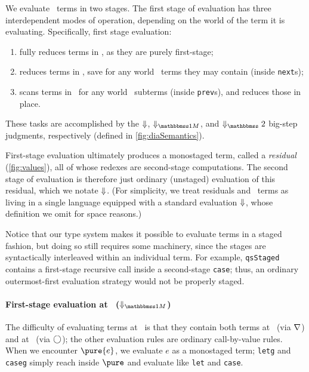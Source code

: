 \begin{abstrsyn}

We evaluate \lang\ terms in two stages. The first stage of evaluation has 
three interdependent modes of operation, depending on the world of the term it is evaluating.
Specifically, first stage evaluation:
\begin{enumerate}
\item fully reduces terms in \bbonep, as they are purely first-stage;
\item reduces terms in \bbonem, save for any world \bbtwo\ terms they may
contain (inside \texttt{next}s);
\item scans terms in \bbtwo\ for any world \bbonem\ subterms (inside \texttt{prev}s), 
and reduces those in place.
\end{enumerate}
These tasks are accomplished by the ${\Downarrow}$, $\redonesym$, and $\redtwosym$
big-step judgments, respectively (defined in \ref{fig:diaSemantics}).

First-stage evaluation ultimately produces a monostaged term, called a \emph{residual}
(\ref{fig:values}), all of whose redexes are second-stage computations. The
second stage of evaluation is therefore just ordinary (unstaged) evaluation of
this residual, which we notate ${\Downarrow}$. (For simplicity, we treat residuals
and \bbonep\ terms as living in a single language equipped with a standard
evaluation ${\Downarrow}$, whose definition we omit for space reasons.)

Notice that our type system makes it possible to evaluate terms in a staged
fashion, but doing so still requires some machinery, since the stages are
syntactically interleaved within an individual term. For example,
\texttt{qsStaged} contains a first-stage recursive call inside a second-stage
\texttt{case}; thus, an ordinary outermost-first evaluation strategy would not
be properly staged.

\paragraph{First-stage evaluation at \bbonem\ ($\redonesym$)}
The difficulty of evaluating terms at \bbonem\ is that they contain both terms
at \bbonep\ (via $\nabla$) and at \bbtwo\ (via $\bigcirc$); the other evaluation
rules are ordinary call-by-value rules. When we encounter $\pure{e}$, we
evaluate $e$ as a monostaged term; \texttt{letg} and \texttt{caseg} simply reach
inside $\pure$ and evaluate like \texttt{let} and \texttt{case}.


\end{abstrsyn}
